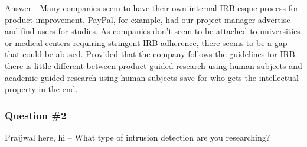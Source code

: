 Answer - Many companies seem to have their own internal IRB-esque process for product improvement. PayPal, for example, had our project manager advertise and find users for studies. As companies don't seem to be attached to universities or medical centers requiring stringent IRB adherence, there seems to be a gap that could be abused. Provided that the company follows the guidelines for IRB there is little different between product-guided research using human subjects and academic-guided research using human subjects save for who gets the intellectual property in the end. 

\subsubsection{Question \#2}
Prajjwal here, hi -- What type of intrusion detection are you researching?